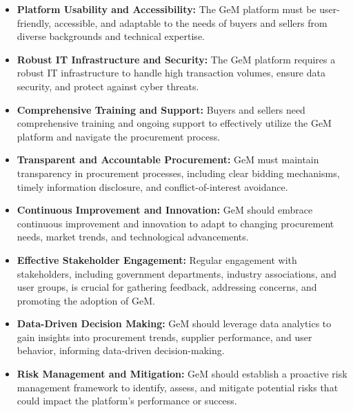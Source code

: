 \begin{itemize}
    \item \textbf{Platform Usability and Accessibility:} The GeM platform must be user-friendly, accessible, and adaptable to the needs of buyers and sellers from diverse backgrounds and technical expertise.
    
    \item \textbf{Robust IT Infrastructure and Security:} The GeM platform requires a robust IT infrastructure to handle high transaction volumes, ensure data security, and protect against cyber threats.
    
    \item \textbf{Comprehensive Training and Support:} Buyers and sellers need comprehensive training and ongoing support to effectively utilize the GeM platform and navigate the procurement process.
    
    \item \textbf{Transparent and Accountable Procurement:} GeM must maintain transparency in procurement processes, including clear bidding mechanisms, timely information disclosure, and conflict-of-interest avoidance.
    
    \item \textbf{Continuous Improvement and Innovation:} GeM should embrace continuous improvement and innovation to adapt to changing procurement needs, market trends, and technological advancements.
    
    \item \textbf{Effective Stakeholder Engagement:} Regular engagement with stakeholders, including government departments, industry associations, and user groups, is crucial for gathering feedback, addressing concerns, and promoting the adoption of GeM.
    
    \item \textbf{Data-Driven Decision Making:} GeM should leverage data analytics to gain insights into procurement trends, supplier performance, and user behavior, informing data-driven decision-making.
    
    \item \textbf{Risk Management and Mitigation:} GeM should establish a proactive risk management framework to identify, assess, and mitigate potential risks that could impact the platform's performance or success.
\end{itemize}







